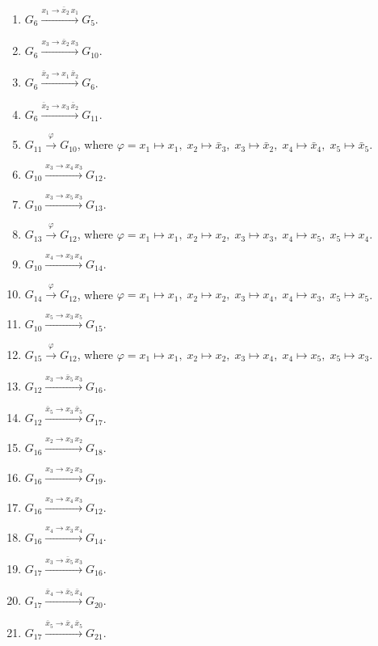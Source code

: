 \begin{enumerate}[leftmargin=*]
\item $G_{6} \xrightarrow{x_{1} \to \bar{x}_{2}\,x_{1}} G_{5}$.
\item $G_{6} \xrightarrow{x_{3} \to \bar{x}_{2}\,x_{3}} G_{10}$.
\item $G_{6} \xrightarrow{\bar{x}_{2} \to x_{1}\,\bar{x}_{2}} G_{6}$.
\item $G_{6} \xrightarrow{\bar{x}_{2} \to x_{3}\,\bar{x}_{2}} G_{11}$.
\item $G_{11} \xrightarrow{\varphi} G_{10}$, where $\varphi=x_{1} \mapsto x_{1},\; x_{2} \mapsto \bar{x}_{3},\; x_{3} \mapsto \bar{x}_{2},\; x_{4} \mapsto \bar{x}_{4},\; x_{5} \mapsto \bar{x}_{5}$.
\item $G_{10} \xrightarrow{x_{3} \to x_{4}\,x_{3}} G_{12}$.
\item $G_{10} \xrightarrow{x_{3} \to x_{5}\,x_{3}} G_{13}$.
\item $G_{13} \xrightarrow{\varphi} G_{12}$, where $\varphi=x_{1} \mapsto x_{1},\; x_{2} \mapsto x_{2},\; x_{3} \mapsto x_{3},\; x_{4} \mapsto x_{5},\; x_{5} \mapsto x_{4}$.
\item $G_{10} \xrightarrow{x_{4} \to x_{3}\,x_{4}} G_{14}$.
\item $G_{14} \xrightarrow{\varphi} G_{12}$, where $\varphi=x_{1} \mapsto x_{1},\; x_{2} \mapsto x_{2},\; x_{3} \mapsto x_{4},\; x_{4} \mapsto x_{3},\; x_{5} \mapsto x_{5}$.
\item $G_{10} \xrightarrow{x_{5} \to x_{3}\,x_{5}} G_{15}$.
\item $G_{15} \xrightarrow{\varphi} G_{12}$, where $\varphi=x_{1} \mapsto x_{1},\; x_{2} \mapsto x_{2},\; x_{3} \mapsto x_{4},\; x_{4} \mapsto x_{5},\; x_{5} \mapsto x_{3}$.
\item $G_{12} \xrightarrow{x_{3} \to \bar{x}_{5}\,x_{3}} G_{16}$.
\item $G_{12} \xrightarrow{\bar{x}_{5} \to x_{3}\,\bar{x}_{5}} G_{17}$.
\item $G_{16} \xrightarrow{x_{2} \to x_{3}\,x_{2}} G_{18}$.
\item $G_{16} \xrightarrow{x_{3} \to x_{2}\,x_{3}} G_{19}$.
\item $G_{16} \xrightarrow{x_{3} \to x_{4}\,x_{3}} G_{12}$.
\item $G_{16} \xrightarrow{x_{4} \to x_{3}\,x_{4}} G_{14}$.
\item $G_{17} \xrightarrow{x_{3} \to \bar{x}_{5}\,x_{3}} G_{16}$.
\item $G_{17} \xrightarrow{\bar{x}_{4} \to \bar{x}_{5}\,\bar{x}_{4}} G_{20}$.
\item $G_{17} \xrightarrow{\bar{x}_{5} \to \bar{x}_{4}\,\bar{x}_{5}} G_{21}$.

\end{enumerate}
